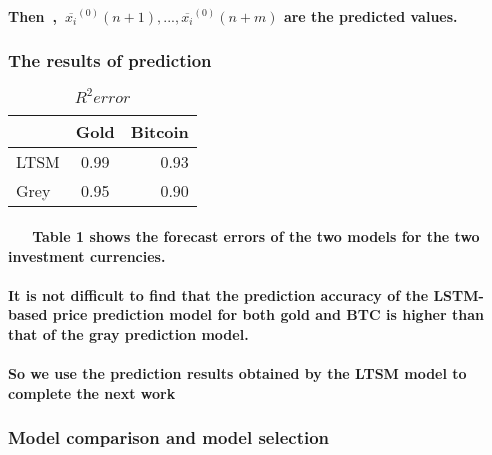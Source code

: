 \documentclass{mcmthesis}
\begin{document}
	\paragraph{Then\ ,\ $\overline{x_{i}}^{(0)}(n+1),...,\overline{x_{i}}^{(0)}(n+m)$ are the predicted values. }
	
	\subsubsection{The results of prediction}
	


	

	

	
	\begin{table}[h]
		\centering
		\caption{$R^2 error$}\label{cjd}
		\begin{tabular}{|l|c|r|}
			\hline
			\  & Gold & Bitcoin \\
			\hline
			LTSM & 0.99 & 0.93 \\
			\hline
			Grey & 0.95 & 0.90\\
			\hline
		\end{tabular}
	\end{table}
	
	

	\paragraph{
		\ \ \ Table 1 shows the forecast errors of the two models for the two investment currencies.
	}
	
	\paragraph{
		It is not difficult to find that the prediction accuracy of the LSTM-based price prediction model for both gold and BTC is higher than that of the gray prediction model.
	}
	
	\paragraph{
		So we use the prediction results obtained by the LTSM model to complete the next work
	}
	
	\subsubsection{Model comparison and model selection}
\end{document}

